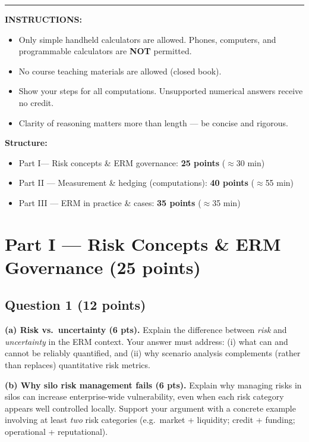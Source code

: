 \documentclass[11pt,a4paper]{article}
\begin{document}
\vspace{8mm}
\hrule
\vspace{5mm}

\noindent\textbf{INSTRUCTIONS:}
\begin{itemize}
  \item[$\bullet$] Only simple handheld calculators are allowed. Phones, computers, and programmable calculators are \textbf{NOT} permitted.
  \item[$\bullet$] No course teaching materials are allowed (closed book).
  \item[$\bullet$] Show your steps for all computations. Unsupported numerical answers receive no credit.
  \item[$\bullet$] Clarity of reasoning matters more than length --- be concise and rigorous.
\end{itemize}

\vspace{3mm}
\noindent\textbf{Structure:}
\begin{itemize}
  \item[$\bullet$] Part I\hspace{0.5em}--- Risk concepts \& ERM governance: \textbf{25 points} ($\approx$30 min)
  \item[$\bullet$] Part II --- Measurement \& hedging (computations): \textbf{40 points} ($\approx$55 min)
  \item[$\bullet$] Part III --- ERM in practice \& cases: \textbf{35 points} ($\approx$35 min)
\end{itemize}


\newpage
\section*{Part I --- Risk Concepts \& ERM Governance \hfill (25 points)}

\subsection*{Question 1 \hfill (12 points)}

\textbf{(a) Risk vs.\ uncertainty (6 pts).}
Explain the difference between \emph{risk} and \emph{uncertainty} in the ERM context.
Your answer must address: (i) what can and cannot be reliably quantified,
and (ii) why scenario analysis complements (rather than replaces) quantitative risk metrics.

\medskip
\textbf{(b) Why silo risk management fails (6 pts).}
Explain why managing risks in silos can increase enterprise-wide vulnerability, even when each
risk category appears well controlled locally.
Support your argument with a concrete example involving at least \emph{two} risk categories
(e.g.\ market + liquidity; credit + funding; operational + reputational).
\end{document}
